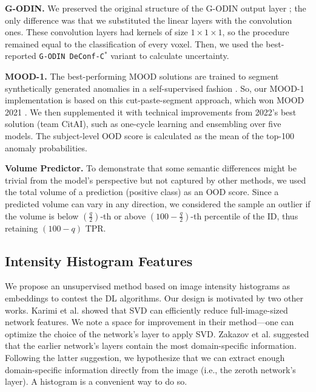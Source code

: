 \textbf{G-ODIN.} We preserved the original structure of the G-ODIN output layer \cite{hsu2020generalized}; the only difference was that we substituted the linear layers with the convolution ones. These convolution layers had kernels of size $1 \times 1 \times 1$, so the procedure remained equal to the classification of every voxel. Then, we used the best-reported \texttt{G-ODIN DeConf-C$^*$} variant to calculate uncertainty. %


\textbf{MOOD-1.} The best-performing MOOD solutions are trained to segment synthetically generated anomalies in a self-supervised fashion \cite{zimmerer2022mood}. So, our MOOD-1 implementation is based on this cut-paste-segment approach, which won MOOD 2021 \cite{cho2021self}. We then supplemented it with technical improvements from 2022's best solution (team CitAI), such as one-cycle learning and ensembling over five models. The subject-level OOD score is calculated as the mean of the top-100 anomaly probabilities.

\textbf{Volume Predictor.} To demonstrate that some semantic differences might be trivial from the model's perspective but not captured by other methods, we used the total volume of a prediction (positive class) as an OOD score. Since a predicted volume can vary in any direction, we considered the sample an outlier if the volume is below $(\frac{q}{2})$-th or above $(100 - \frac{q}{2})$-th percentile of the ID, thus retaining $(100 - q)$ TPR.


\subsection{Intensity Histogram Features}

We propose an unsupervised method based on image intensity histograms as embeddings to contest the DL algorithms. Our design is motivated by two other works. Karimi et al. \cite{karimi2022improving} showed that SVD can efficiently reduce full-image-sized network features. We note a space for improvement in their method---one can optimize the choice of the network's layer to apply SVD. Zakazov et al. \cite{zakazov2021anatomy} suggested that the earlier network's layers contain the most domain-specific information. Following the latter suggestion, we hypothesize that we can extract enough domain-specific information directly from the image (i.e., the zeroth network's layer). A histogram is a convenient way to do so.

